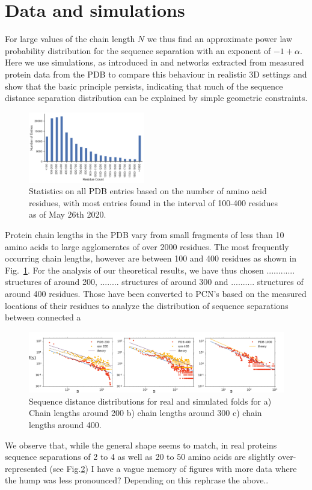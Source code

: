 \documentclass[
reprint,
twocolumn,
amsmath,amssymb,superscriptaddress,aps,
pre]{revtex4-1}
\newcommand{\red}[1]{\textcolor{red!80!black}{#1}}
\begin{document}
\section*{Data and simulations}
 For large values of the chain length $N$ we thus find an approximate power law probability distribution for the sequence separation with an exponent of $-1+\alpha$. Here we use simulations, as introduced in \cite{molkenthin2020self} and networks extracted from measured protein data from the PDB \cite{PDB} to compare this behaviour in realistic 3D settings and show that the basic principle persists, indicating that much of the sequence distance separation distribution can be explained by simple geometric constraints.
 \begin{figure}[h]
        \centering
	\includegraphics[width=0.45\textwidth]{figures/pdb_statistics.pdf}
        \caption{Statistics on all PDB entries based on the number of amino acid residues, with most entries found in the interval of 100-400 residues as of May 26th 2020.}
        \label{fig:pdb_stats}
\end{figure}

Protein chain lengths in the PDB vary from small fragments of less than 10 amino acids to large agglomerates of over 2000 residues. The most frequently occurring chain lengths, however are between 100 and 400 residues as shown in Fig.~\ref{fig:pdb_stats}. For the analysis of our theoretical results, we have thus chosen ............ structures of around 200, ........ structures of around 300 and .......... structures of around 400 residues. Those have been converted to PCN's based on the measured locations of their residues to analyze the distribution of sequence separations between connected a

 
\begin{figure}[t]
        \centering
	\includegraphics[width=\textwidth]{paper/figures/resultsfig_old.pdf}
        \caption{Sequence distance distributions for real and simulated folds for a) Chain lengths around 200 b) chain lengths around 300 c) chain lengths around 400.
        }
        \label{fig:sdd}
\end{figure}
We observe that, while the general shape seems to match, in real proteins sequence separations of 2 to 4 as well as 20 to 50 amino acids are slightly over-represented (see Fig.\ref{fig:sdd}) \red{I have a vague memory of figures with more data where the hump was less pronounced? Depending on this rephrase the above.}.
\end{document}
